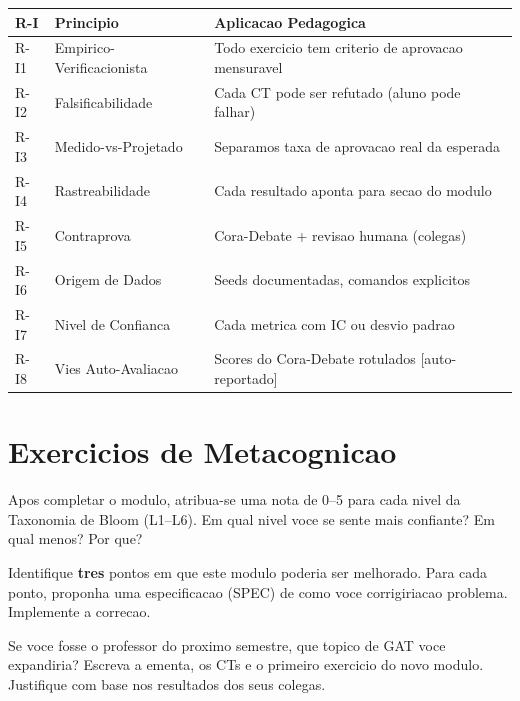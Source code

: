 \begin{center}
\begin{tabular}{p{}p{}p{}}
\toprule
\textbf{R-I} & \textbf{Principio} & \textbf{Aplicacao Pedagogica} \\
\midrule
R-I1 & Empirico-Verificacionista & Todo exercicio tem criterio de aprovacao mensuravel \\
R-I2 & Falsificabilidade & Cada CT pode ser refutado (aluno pode falhar) \\
R-I3 & Medido-vs-Projetado & Separamos taxa de aprovacao real da esperada \\
R-I4 & Rastreabilidade & Cada resultado aponta para secao do modulo \\
R-I5 & Contraprova & Cora-Debate + revisao humana (colegas) \\
R-I6 & Origem de Dados & Seeds documentadas, comandos explicitos \\
R-I7 & Nivel de Confianca & Cada metrica com IC ou desvio padrao \\
R-I8 & Vies Auto-Avaliacao & Scores do Cora-Debate rotulados [auto-reportado] \\
\bottomrule
\end{tabular}
\end{center}

\section{Exercicios de Metacognicao}

\begin{exer}
Apos completar o modulo, atribua-se uma nota de 0--5 para cada nivel
da Taxonomia de Bloom (L1--L6). Em qual nivel voce se sente mais
confiante? Em qual menos? Por que?
\end{exer}

\begin{exer}
Identifique \textbf{tres} pontos em que este modulo poderia ser
melhorado. Para cada ponto, proponha uma especificacao (SPEC) de
como voce corrigiriacao problema. Implemente a correcao.
\end{exer}

\begin{exer}
Se voce fosse o professor do proximo semestre, que topico de GAT
voce expandiria? Escreva a ementa, os CTs e o primeiro exercicio
do novo modulo. Justifique com base nos resultados dos seus colegas.
\end{exer}


